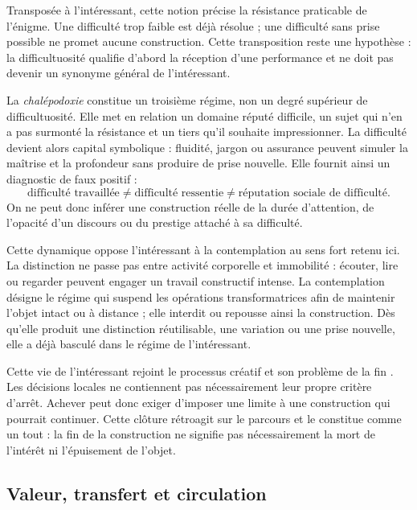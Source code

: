 \documentclass[11pt,a4paper]{article}
\begin{document}
Transposée à l'intéressant, cette notion précise la résistance praticable de
l'énigme. Une difficulté trop faible est déjà résolue ; une difficulté sans
prise possible ne promet aucune construction. Cette transposition reste une
hypothèse : la difficultuosité qualifie d'abord la réception d'une performance
et ne doit pas devenir un synonyme général de l'intéressant.

La \emph{chalépodoxie} constitue un troisième régime, non un degré supérieur de
difficultuosité. Elle met en relation un domaine réputé difficile, un sujet qui
n'en a pas surmonté la résistance et un tiers qu'il souhaite impressionner. La
difficulté devient alors capital symbolique : fluidité, jargon ou assurance
peuvent simuler la maîtrise et la profondeur sans produire de prise nouvelle.
Elle fournit ainsi un diagnostic de faux positif :
\[
  \text{difficulté travaillée}
  \neq \text{difficulté ressentie}
  \neq \text{réputation sociale de difficulté}.
\]
On ne peut donc inférer une construction réelle de la durée d'attention, de
l'opacité d'un discours ou du prestige attaché à sa difficulté.

Cette dynamique oppose l'intéressant à la contemplation au sens fort retenu ici.
La distinction ne passe pas entre activité corporelle et immobilité : écouter,
lire ou regarder peuvent engager un travail constructif intense. La contemplation
désigne le régime qui suspend les opérations transformatrices afin de maintenir
l'objet intact ou à distance ; elle interdit ou repousse ainsi la construction.
Dès qu'elle produit une distinction réutilisable, une variation ou une prise
nouvelle, elle a déjà basculé dans le régime de l'intéressant.

Cette vie de l'intéressant rejoint le processus créatif et son problème de la
fin \parencite{pachet2026impossibilite}. Les décisions locales ne contiennent
pas nécessairement leur propre critère d'arrêt. Achever peut donc exiger
d'imposer une limite à une construction qui pourrait continuer. Cette clôture
rétroagit sur le parcours et le constitue comme un tout : la fin de la
construction ne signifie pas nécessairement la mort de l'intérêt ni
l'épuisement de l'objet.

\subsection{Valeur, transfert et circulation}
\end{document}
